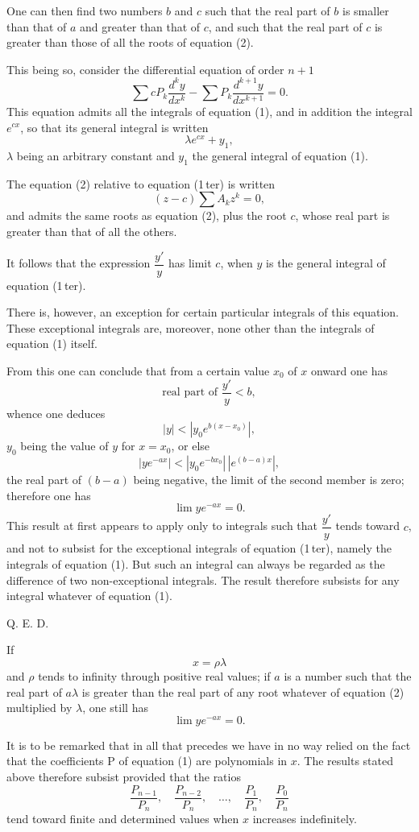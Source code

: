 \documentclass[11pt]{article}
\begin{document}
One can then find two numbers $b$ and $c$ such that the real part of $b$ is smaller than that of $a$ and greater than that of $c$, and such that the real part of $c$ is greater than those of all the roots of equation (2).

This being so, consider the differential equation of order $n+1$
\[
\tag{1\,ter}
\sum cP_k\frac{d^ky}{dx^k}-\sum P_k\frac{d^{k+1}y}{dx^{k+1}}=0.
\]
This equation admits all the integrals of equation (1), and in addition the integral $e^{cx}$, so that its general integral is written
\[
\lambda e^{cx}+y_1,
\]
$\lambda$ being an arbitrary constant and $y_1$ the general integral of equation (1).

The equation (2) relative to equation (1\,ter) is written
\[
\tag{2\,ter}
(z-c)\sum A_kz^k=0,
\]
and admits the same roots as equation (2), plus the root $c$, whose real part is greater than that of all the others.

It follows that the expression $\dfrac{y'}{y}$ has limit $c$, when $y$ is the general integral of equation (1\,ter).

There is, however, an exception for certain particular integrals of this equation. These exceptional integrals are, moreover, none other than the integrals of equation (1) itself.

From this one can conclude that from a certain value $x_0$ of $x$ onward one has
\[
\text{real part of }\frac{y'}{y}<b,
\]
whence one deduces
\[
|y|<|y_0e^{b(x-x_0)}|,
\]
$y_0$ being the value of $y$ for $x=x_0$, or else
\[
|ye^{-ax}|<|y_0e^{-bx_0}|\,|e^{(b-a)x}|,
\]
the real part of $(b-a)$ being negative, the limit of the second member is zero; therefore one has
\[
\lim ye^{-ax}=0.
\]
This result at first appears to apply only to integrals such that $\dfrac{y'}{y}$ tends toward $c$, and not to subsist for the exceptional integrals of equation (1\,ter), namely the integrals of equation (1). But such an integral can always be regarded as the difference of two non-exceptional integrals. The result therefore subsists for any integral whatever of equation (1).
\begin{flushright}Q. E. D.\end{flushright}

If
\[
x=\rho\lambda
\]
and $\rho$ tends to infinity through positive real values; if $a$ is a number such that the real part of $a\lambda$ is greater than the real part of any root whatever of equation (2) multiplied by $\lambda$, one still has
\[
\lim ye^{-ax}=0.
\]

It is to be remarked that in all that precedes we have in no way relied on the fact that the coefficients P of equation (1) are polynomials in $x$. The results stated above therefore subsist provided that the ratios
\[
\frac{P_{n-1}}{P_n},\quad
\frac{P_{n-2}}{P_n},\quad
\ldots,\quad
\frac{P_1}{P_n},\quad
\frac{P_0}{P_n}
\]
tend toward finite and determined values when $x$ increases indefinitely.
\end{document}
